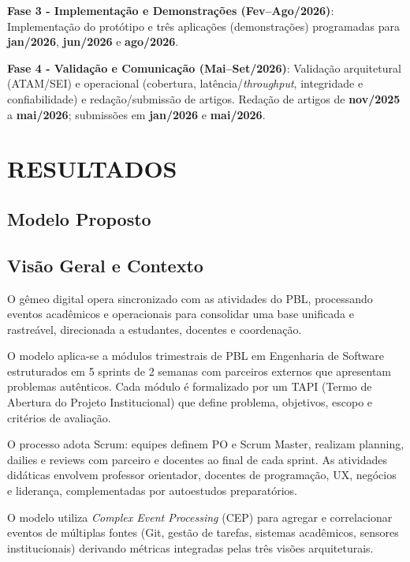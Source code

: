 \documentclass[12pt,a4paper]{article}
\begin{document}
\textbf{Fase 3 - Implementação e Demonstrações (Fev–Ago/2026)}: Implementação do protótipo e três aplicações (demonstrações) programadas para \textbf{jan/2026}, \textbf{jun/2026} e \textbf{ago/2026}.

\textbf{Fase 4 - Validação e Comunicação (Mai–Set/2026)}: Validação arquitetural (ATAM/SEI) e operacional (cobertura, latência/\textit{throughput}, integridade e confiabilidade) e redação/submissão de artigos. Redação de artigos de \textbf{nov/2025} a \textbf{mai/2026}; submissões em \textbf{jan/2026} e \textbf{mai/2026}.

\section{RESULTADOS}

\subsection{Modelo Proposto}



\subsection{Visão Geral e Contexto}

O gêmeo digital opera sincronizado com as atividades do PBL, processando eventos acadêmicos e operacionais para consolidar uma base unificada e rastreável, direcionada a estudantes, docentes e coordenação.

O modelo aplica-se a módulos trimestrais de PBL em Engenharia de Software estruturados em 5 sprints de 2 semanas com parceiros externos que apresentam problemas autênticos. Cada módulo é formalizado por um TAPI (Termo de Abertura do Projeto Institucional) que define problema, objetivos, escopo e critérios de avaliação.

O processo adota Scrum: equipes definem PO e Scrum Master, realizam planning, dailies e reviews com parceiro e docentes ao final de cada sprint. As atividades didáticas envolvem professor orientador, docentes de programação, UX, negócios e liderança, complementadas por autoestudos preparatórios.



O modelo utiliza \textit{Complex Event Processing} (CEP) para agregar e correlacionar eventos de múltiplas fontes (Git, gestão de tarefas, sistemas acadêmicos, sensores institucionais) derivando métricas integradas pelas três visões arquiteturais.
\end{document}
